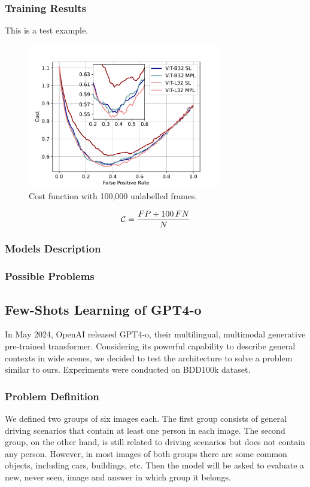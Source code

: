 \subsubsection{Training Results}
This is a test example.
\begin{figure}[h]
    \centering
    \includegraphics[width=0.75\textwidth]{images/bdd100k/training/cost.pdf}
    \caption[Cost function with 100,000 unlabelled frames.]
    {Cost function with 100,000 unlabelled frames.}
    \label{fig:cost_100k_ul}
\end{figure}
\begin{equation}
\centering
\mathcal{C} = \frac{FP + 100 \, FN}{N}
\end{equation}

\subsubsection{Models Description}

\subsubsection{Possible Problems}

\subsection{Few-Shots Learning of GPT4-o}
In May 2024, OpenAI released GPT4-o, their multilingual, multimodal generative 
pre-trained transformer. Considering its powerful capability to describe general 
contexts in wide scenes, we decided to test the architecture to solve a problem 
similar to ours. Experiments were conducted on BDD100k dataset.

\subsubsection{Problem Definition}
We defined two groups of six images each. The first group consists of general 
driving scenarios that contain at least one person in each image. 
The second group, on the other hand, is still related to driving scenarios but 
does not contain any person. However, in most images of both groups there are 
some common objects, including cars, buildings, etc.
Then the model will be asked to evaluate a new, never seen, image and answer 
in which group it belongs.

